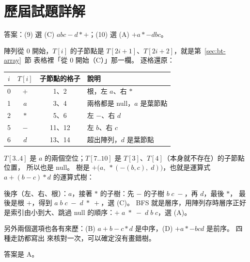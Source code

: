 \section*{歷屆試題詳解}

答案：(9) 選 (C) $abc-d*+$；(10) 選 (A) $+a*-dbc$。

陣列從 $0$ 開始，$T[i]$ 的子節點是 $T[2i + 1]$、$T[2i + 2]$，就是第~\ref{sec:bt-array}~節
表格裡「從 $0$ 開始（C）」那一欄。 逐格還原：
\begin{center}
\small
\begin{tabular}{cccl}
\toprule
$i$ & $T[i]$ & 子節點的格子 & 說明 \\
\midrule
0 & $+$ & 1、2 & 根，左 $a$、右 $*$ \\
1 & $a$ & 3、4 & 兩格都是 null，$a$ 是葉節點 \\
2 & $*$ & 5、6 & 左 $-$、右 $d$ \\
5 & $-$ & 11、12 & 左 $b$、右 $c$ \\
6 & $d$ & 13、14 & 超出陣列，$d$ 是葉節點 \\
\bottomrule
\end{tabular}
\end{center}
$T[3..4]$ 是 $a$ 的兩個空位；$T[7..10]$ 是 $T[3]$、$T[4]$（本身就不存在）的子節點位置，
所以也是 null。 樹是 $+\bigl(a,\; *(-(b, c),\; d)\bigr)$，也就是運算式 $a + (b - c) * d$
的運算式樹：

\begin{center}
\end{center}

後序（左、右、根）：$a$，接著 $*$ 的子樹：先 $-$ 的子樹 $b\;c\;-$，再 $d$，最後 $*$，
最後是根 $+$，得到 $a\;b\;c\;-\;d\;*\;+$，選 (C)。 BFS 就是層序，用陣列存時層序正好
是索引由小到大、跳過 null 的順序：$+\;a\;*\;-\;d\;b\;c$，選 (A)。

另外兩個選項也各有來歷：(B) $a+b-c*d$ 是中序，(D) $+a*-bcd$ 是前序。 四種走訪都寫出
來核對一次，可以確定沒有畫錯樹。

答案是 A。

